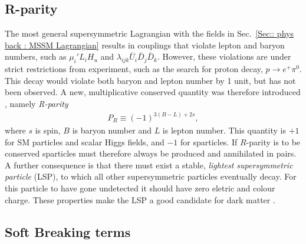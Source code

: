 \documentclass[twoside,english]{uiofysmaster}
\begin{document}
{\subsection{R-parity}\label{Sec:: phys back : R-parity}

The most general supersymmetric Lagrangian with the fields in Sec.~\ref{Sec:: phys back : MSSM Lagrangian} results in couplings that violate lepton and baryon numbers, such as $\mu_i' L_i H_u$ and $ \lambda_{ijk} \bar{U}_i \bar{D}_j \bar{D}_k $. However, these violations are under strict restrictions from experiment, such as the search for proton decay, $p \rightarrow e^+ \pi^0$. This decay would violate both baryon and lepton number by 1 unit, but has not been observed. A new, multiplicative conserved quantity was therefore introduced \cite{Farrar:1978xj}, namely \textit{R-parity} 
\begin{align}\label{Eq:: R-parity}
P_R \equiv (-1)^{3(B-L) +2s},
\end{align}
where $s$ is spin, $B$ is baryon number and $L$ is lepton number. This quantity is $+1$ for SM particles and scalar Higgs fields, and $-1$ for sparticles. If $R$-parity is to be conserved sparticles must therefore always be produced and annihilated in pairs. A further consequence is that there must exist a stable, \textit{lightest supersymmetric particle} (LSP), to which all other supersymmetric particles eventually decay. For this particle to have gone undetected it should have zero eletric and colour charge. These properties make the LSP a good candidate for dark matter \cite{Weinberg:1995mt}.

\subsection{Soft Breaking terms}\label{Sec:: phys back : Soft breaking terms}

}
\end{document}
